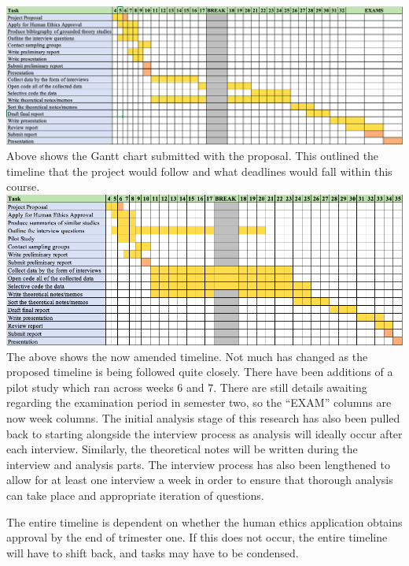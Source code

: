 \includegraphics[width=\textwidth]{figures/fig1.png}
\newline
\newline
Above shows the Gantt chart submitted with the proposal. This outlined the timeline that the project would follow and what deadlines would fall within this course. 
\newline
\newline
\includegraphics[width=\textwidth]{figures/fig2.png}
\newline
\newline
The above shows the now amended timeline. Not much has changed as the proposed timeline is being followed quite closely. There have been additions of a pilot study which ran across weeks 6 and 7. There are still details awaiting regarding the examination period in semester two, so the “EXAM” columns are now week columns. The initial analysis stage of this research has also been pulled back to starting alongside the interview process as analysis will ideally occur after each interview. Similarly, the theoretical notes will be written during the interview and analysis parts. The interview process has also been lengthened to allow for at least one interview a week in order to ensure that thorough analysis can take place and appropriate iteration of questions.
\newline
\par The entire timeline is dependent on whether the human ethics application obtains approval by the end of trimester one.  If this does not occur, the entire timeline will have to shift back, and tasks may have to be condensed.






